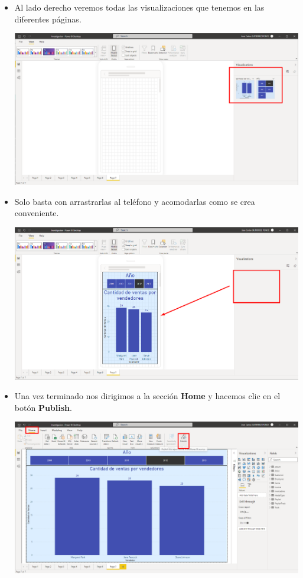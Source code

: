 \documentclass[12pt,letterpaper]{article}
\newcommand\tab[1][1cm]{\hspace*{#1}}
\begin{document}
\begin{enumerate}[\tab 1.]
\begin{itemize}
\begin{center}
            \end{center}
            \item Al lado derecho veremos todas las visualizaciones que tenemos en las diferentes páginas.
            \begin{center}
                \includegraphics[width=13cm]{./img/img25.2.png}
            \end{center}
            \item Solo basta con arrastrarlas al teléfono y acomodarlas como se crea conveniente.
            \begin{center}
                \includegraphics[width=13cm]{./img/img25.3.png}
            \end{center}
            \item Una vez terminado nos dirigimos a la sección \textbf{Home} y hacemos clic en el botón \textbf{Publish}.
            \begin{center}
                \includegraphics[width=13cm]{./img/img25.4.png}

\end{center}
\end{itemize}
\end{enumerate}
\end{document}

